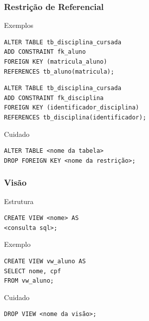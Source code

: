 \documentclass{beamer}
\begin{document}
\begin{frame}[fragile]
\frametitle{Restrição de Referencial}

\begin{exampleblock}{Exemplos}
	\begin{lstlisting}
ALTER TABLE tb_disciplina_cursada
ADD CONSTRAINT fk_aluno
FOREIGN KEY (matricula_aluno)
REFERENCES tb_aluno(matricula);
	\end{lstlisting}
	
	\begin{lstlisting}
ALTER TABLE tb_disciplina_cursada
ADD CONSTRAINT fk_disciplina
FOREIGN KEY (identificador_disciplina)
REFERENCES tb_disciplina(identificador);
	\end{lstlisting}	
\end{exampleblock}\vfill

\begin{alertblock}{Cuidado}
	\begin{lstlisting}
ALTER TABLE <nome da tabela>
DROP FOREIGN KEY <nome da restrição>;	
\end{lstlisting}
\end{alertblock}
\end{frame}

\begin{frame}[fragile]
\frametitle{Visão}

\begin{block}{Estrutura}
	\begin{lstlisting}
CREATE VIEW <nome> AS
<consulta sql>;
	\end{lstlisting}
\end{block}\vfill

\begin{exampleblock}{Exemplo}
	\begin{lstlisting}
CREATE VIEW vw_aluno AS
SELECT nome, cpf
FROM vw_aluno;
	\end{lstlisting}
\end{exampleblock}\vfill

\begin{alertblock}{Cuidado}
	\begin{lstlisting}
DROP VIEW <nome da visão>;
	\end{lstlisting}
\end{alertblock}
\end{frame}
\end{document}
